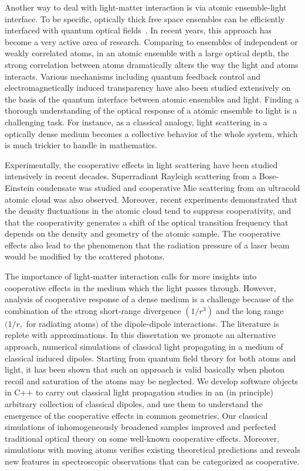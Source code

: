 Another way to deal with light-matter interaction is via atomic ensemble-light interface. To be specific,  optically thick free space ensembles can be efficiently interfaced with quantum optical fields~\cite{RevModPhys.82.1041}. In recent years, this approach has become a very active area of research. Comparing to ensembles of independent or weakly correlated atoms, in an atomic ensemble with a large optical depth, the strong correlation between atoms dramatically alters the way the light and atoms interacts. Various mechanisms including quantum feedback control and electromagnetically induced transparency have also been studied extensively on the basis of the quantum interface between atomic ensembles and light. Finding a thorough understanding of the optical response of a atomic ensemble to light is a challenging task. For instance, as a classical analogy, light scattering in a optically dense medium becomes a collective behavior of the whole system, which is much trickier to handle in mathematics.

Experimentally, the cooperative effects in light scattering have been studied intensively in recent decades.  Superradiant Rayleigh scattering from a Bose-Einstein condensate was studied\cite{Inouye23071999,PhysRevLett.83.5202,PhysRevA.62.063615} and cooperative Mie scattering from an ultracold atomic cloud was also observed\cite{PhysRevA.82.011404}. Moreover, recent experiments demonstrated that the density fluctuations in the atomic cloud tend to suppress cooperativity\cite{PhysRevLett.104.183602}, and that the cooperativity generates a shift of the optical transition frequency that depends on the density and geometry of the atomic sample\cite{PhysRevLett.108.173601}. The cooperative effects also lead to the phenomenon that the radiation pressure of a laser beam would be modified by the scattered photons\cite{Eur.Phys.J.D.58.1}.

The importance of light-matter interaction calls for more insights into cooperative effects in the medium which the light passes through. However, analysis of cooperative response of a dense medium is a challenge because of the combination of the strong short-range divergence $(1/r^3)$ and the long range $(1/r, $ for radiating atoms$)$ of the dipole-dipole interactions. The literature is replete with approximations\cite{FRIEDBERG1973101}. In this dissertation we promote an alternative approach, numerical simulations of classical light propagating in a medium of classical induced dipoles. Starting from quantum field theory for both atoms and light, it has been shown\cite{PhysRevA.55.513} that such an approach is valid basically when photon recoil and saturation of the atoms may be neglected. We develop software objects in C++ to carry out classical light propagation studies in an (in principle) arbitrary collection of classical dipoles, and use them to understand the emergence of the cooperative effects in common geometries. Our classical simulations of inhomogeneously broadened samples improved and perfected traditional optical theory on some well-known cooperative effects. Moreover, simulations with moving atoms verifies existing theoretical predictions and reveals new features in spectroscopic observations that can be categorized as cooperative.


